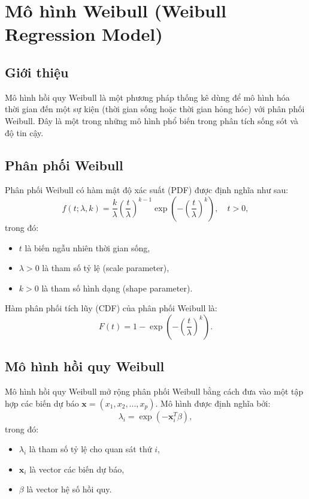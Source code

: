 \chapter{Mô hình Weibull (Weibull Regression Model)}
\section{Giới thiệu}
Mô hình hồi quy Weibull là một phương pháp thống kê dùng để mô hình hóa thời gian đến một sự kiện (thời gian sống hoặc thời gian hỏng hóc) với phân phối Weibull. Đây là một trong những mô hình phổ biến trong phân tích sống sót và độ tin cậy.

\section{Phân phối Weibull}
Phân phối Weibull có hàm mật độ xác suất (PDF) được định nghĩa như sau:
\begin{equation}
    f(t; \lambda, k) = \frac{k}{\lambda} \left( \frac{t}{\lambda} \right)^{k-1} \exp \left( - \left( \frac{t}{\lambda} \right)^k \right), \quad t > 0,
\end{equation}
trong đó:
\begin{itemize}
    \item $t$ là biến ngẫu nhiên thời gian sống,
    \item $\lambda > 0$ là tham số tỷ lệ (scale parameter),
    \item $k > 0$ là tham số hình dạng (shape parameter).
\end{itemize}

Hàm phân phối tích lũy (CDF) của phân phối Weibull là:
\begin{equation}
    F(t) = 1 - \exp \left( - \left( \frac{t}{\lambda} \right)^k \right).
\end{equation}

\section{Mô hình hồi quy Weibull}
Mô hình hồi quy Weibull mở rộng phân phối Weibull bằng cách đưa vào một tập hợp các biến dự báo $\mathbf{x} = (x_1, x_2, ..., x_p)$. Mô hình được định nghĩa bởi:
\begin{equation}
    \lambda_i = \exp(- \mathbf{x}_i^T \beta),
\end{equation}
trong đó:
\begin{itemize}
    \item $\lambda_i$ là tham số tỷ lệ cho quan sát thứ $i$,
    \item $\mathbf{x}_i$ là vector các biến dự báo,
    \item $\beta$ là vector hệ số hồi quy.
\end{itemize}

